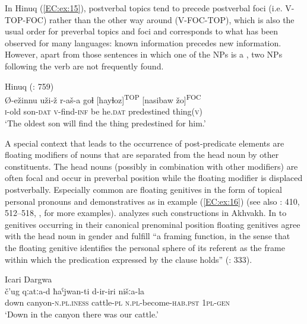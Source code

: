 \documentclass[output=paper,colorlinks,citecolor=brown,draftmode]{langscibook}
\begin{document}
In Hinuq (\ref{EC:ex:15}), postverbal topics tend to precede postverbal foci (i.e. V-TOP-FOC) rather than the other way around (V-FOC-TOP), which is also the usual order for preverbal topics and foci and corresponds to what has been observed for many languages: known information precedes new information. However, apart from those sentences in which one of the NPs is a , two NPs following the verb are not frequently found.

\ea\label{EC:ex:15}
Hinuq (\citealt{forker_grammar_2013}: 759) \\
\gll Ø-ežinnu uži-ž r-aš-a goɬ [hayɬoz]\textsuperscript{TOP} [nasibaw žo]\textsuperscript{FOC} \\
\textsc{i-}old son\textsc{-dat} \textsc{v-}find\textsc{-inf} be he\textsc{.dat} predestined thing(\textsc{v}) \\
\glt `The oldest son will find the thing predestined for him.'
\z

A special context that leads to the occurrence of post-predicate elements are floating modifiers of nouns that are separated from the head noun by other constituents. The head nouns (possibly in combination with other modifiers) are often focal and occur in preverbal position while the floating modifier is displaced postverbally. Especially common are floating genitives in the form of topical personal pronouns and demonstratives as in example (\ref{EC:ex:16}) (see also \citealt{forker_grammar_2020}: 410, 512--518, \citealt{creissels_floating_2013}, \citealt{komen_post-verbal_2017} for more examples). \citet{creissels_floating_2013} analyzes such constructions in Akhvakh. In  to genitives occurring in their canonical prenominal position floating genitives agree with the head noun in gender and fulfill ``a  framing function, in the sense that the floating genitive identifies the personal sphere of its referent as the frame within which the predication expressed by the clause holds'' (\citealt{creissels_floating_2013}: 333). 

\ea\label{EC:ex:16}
Icari Dargwa  \\
\gll č'ug qːatːa-d ħaˁjwan-ti d-ir-iri nišːa-la \\
down canyon\textsc{-n.pl.iness} cattle\textsc{-pl} \textsc{n.pl-}become\textsc{-hab.pst} \textsc{1pl-gen} \\
\glt `Down in the canyon there was our cattle.'
\z
\end{document}

